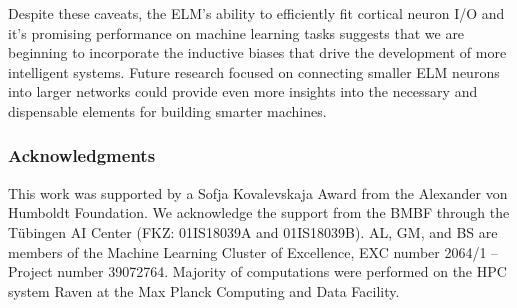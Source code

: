 \documentclass{article} \usepackage{iclr2024_doc_style,times}
\begin{document}
Despite these caveats, the ELM's ability to efficiently fit cortical neuron I/O and it's promising performance on machine learning tasks suggests that we are beginning to incorporate the inductive biases that drive the development of more intelligent systems. Future research focused on connecting smaller ELM neurons into larger networks could provide even more insights into the necessary and dispensable elements for building smarter machines.

\subsubsection*{Acknowledgments}

This work was supported by a Sofja Kovalevskaja Award from the Alexander von Humboldt Foundation. We acknowledge the support from the BMBF through the T\"ubingen AI Center (FKZ: 01IS18039A and 01IS18039B). AL, GM, and BS are members of the Machine Learning Cluster of Excellence, EXC number 2064/1 – Project number 39072764. Majority of computations were performed on the HPC system Raven at the Max Planck Computing and Data Facility.



\newpage




\end{document}
